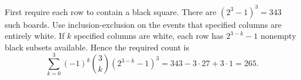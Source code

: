 First require each row to contain a black square. There are $(2^3-1)^3=343$ such boards. Use inclusion-exclusion on the events that specified columns are entirely white. If $k$ specified columns are white, each row has $2^{3-k}-1$ nonempty black subsets available. Hence the required count is
\[
\sum_{k=0}^3(-1)^k\binom3k(2^{3-k}-1)^3
=343-3\cdot27+3\cdot1=\boxed{265}.
\]
